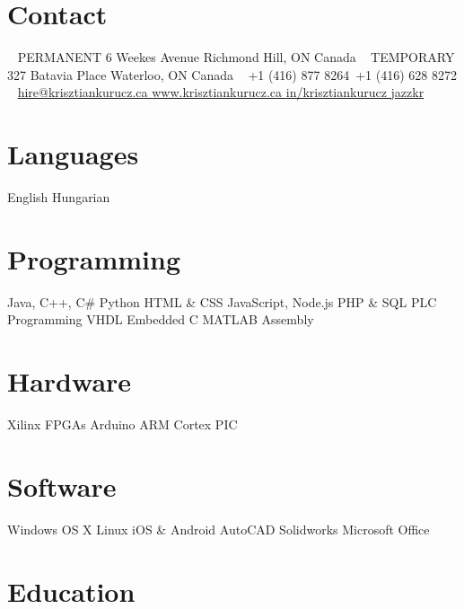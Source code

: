 \documentclass[hidelinks]{kkurucz-cv}
\begin{document}


\begin{aside} %
\section{Contact}
~
{\headingfont PERMANENT}
6 Weekes Avenue
Richmond Hill, ON
Canada
~
{\headingfont TEMPORARY}
327 Batavia Place
Waterloo, ON
Canada
~
{+1 (416) 877 8264\hspace{1.5mm}\mobile}\,
{+1 (416) 628 8272 \phone}
~
\href{mailto:hire@krisztiankurucz.ca}{hire@krisztiankurucz.ca }\mail
\href{http://www.krisztiankurucz.ca}{www.krisztiankurucz.ca }\website
\href{http://ca.linkedin.com/in/krisztiankurucz}{in/krisztiankurucz }\linkedin
\href{http://www.github.com/jazzkr}{jazzkr }\github
\section{Languages}
English
Hungarian
\section{Programming}
Java, C++, C\#
Python
HTML \& CSS
JavaScript, Node.js
PHP \& SQL
PLC Programming
VHDL
Embedded C
MATLAB
Assembly
\section{Hardware}
Xilinx FPGAs
Arduino
ARM Cortex
PIC
\section{Software}
Windows
OS X
Linux
iOS \& Android
AutoCAD
Solidworks
Microsoft Office
\end{aside}


\section{Education}
\end{document}
